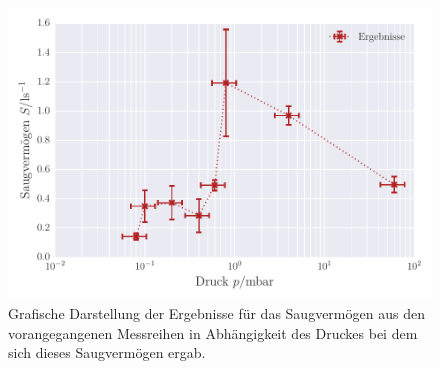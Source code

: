 \begin{figure}[!h]
 \centering
 \includegraphics[scale=0.8]{../Grafiken/Saugvermoegen_Drehschieber.pdf}
 \caption{Grafische Darstellung der Ergebnisse für das Saugvermögen aus den vorangegangenen Messreihen in 
 Abhängigkeit des Druckes bei dem sich dieses Saugvermögen ergab. \label{fig:saugvermögen_drehschieber}}
 \end{figure} 
